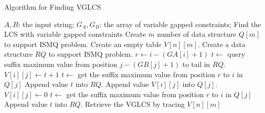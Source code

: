 \begin{algorithm*}[!thb]
  \caption{Algorithm for Finding VGLCS}
  \label{alg:serial-VGLCS}
  \begin{algorithmic}[1]
    \Require
      $A, B$: the input string;
      $G_A, G_B$: the array of variable gapped constraints;
    \Ensure Find the LCS with variable gapped constraints
    \State Create $m$ number of data structure $Q[m]$ to support ISMQ problem.
    \State Create an empty table $V[n][m]$.
      \State Create a data structure $RQ$ to support ISMQ problem.
      \State $r \gets i - (GA[i]+1)$
            \State $t \gets $ query suffix maximum value from position $j - (GB[j]+1)$ to tail in $RQ$.
            \State $V[i][j] \gets t + 1$
            \State $t \gets $ get the suffix maximum value from position $r$ to $i$ in $Q[j]$
            \State Append value $t$ into $RQ$.
            \State Append value $V[i][j]$ into $Q[j]$.
        \Else
            \State $V[i][j] \gets 0$
            \State $t \gets $ get the suffix maximum value from position $r$ to $i$ in $Q[j]$
            \State Append value $t$ into $RQ$.
        \EndIf
      \EndFor
    \EndFor
    \State Retrieve the VGLCS by tracing $V[n][m]$
  \end{algorithmic}
\end{algorithm*}